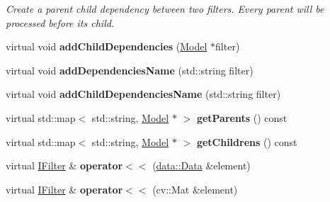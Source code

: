 \begin{DoxyCompactItemize}
\begin{DoxyCompactList}\small\item\em Create a parent child dependency between two filters. Every parent will be processed before its child. \end{DoxyCompactList}\item 
\mbox{\label{classfilter_1_1_i_filter_a49c161e0e74bc8169a47c5832adc80bf}} 
virtual void {\bfseries add\+Child\+Dependencies} (\hyperlink{classfilter_1_1_model}{Model} $\ast$filter)
\item 
\mbox{\label{classfilter_1_1_i_filter_a342b79ca87a0a80cdc9283f791445a5d}} 
virtual void {\bfseries add\+Dependencies\+Name} (std\+::string filter)
\item 
\mbox{\label{classfilter_1_1_i_filter_adad5caef656f6e03875e9370821af953}} 
virtual void {\bfseries add\+Child\+Dependencies\+Name} (std\+::string filter)
\item 
\mbox{\label{classfilter_1_1_i_filter_a5573a79109562b2bce0ef402f016b62b}} 
virtual std\+::map$<$ std\+::string, \hyperlink{classfilter_1_1_model}{Model} $\ast$ $>$ {\bfseries get\+Parents} () const
\item 
\mbox{\label{classfilter_1_1_i_filter_aa4473ecc2a050e587982915958d58591}} 
virtual std\+::map$<$ std\+::string, \hyperlink{classfilter_1_1_model}{Model} $\ast$ $>$ {\bfseries get\+Childrens} () const
\item 
\mbox{\label{classfilter_1_1_i_filter_ae1eb446deaca10fec8882e22c401f3c3}} 
virtual \hyperlink{classfilter_1_1_i_filter}{I\+Filter} \& {\bfseries operator$<$$<$} (\hyperlink{classfilter_1_1data_1_1_data}{data\+::\+Data} \&element)
\item 
\mbox{\label{classfilter_1_1_i_filter_aab026b67b2b7d0675c3c840a7d19a1d4}} 
virtual \hyperlink{classfilter_1_1_i_filter}{I\+Filter} \& {\bfseries operator$<$$<$} (cv\+::\+Mat \&element)
\item 
\mbox{\label{classfilter_1_1_i_filter_acfdd4ae98b9915471dc7990d2d8bce62}} 

\end{DoxyCompactItemize}

